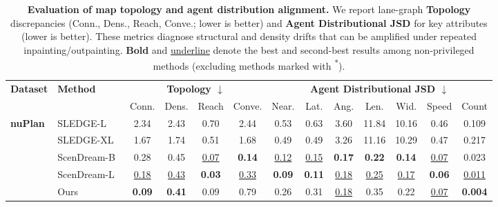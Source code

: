 \documentclass{article}
\newcommand{\best}[1]{\textbf{#1}}
\newcommand{\secbest}[1]{\underline{#1}}
\theoremstyle{plain}
\theoremstyle{definition}
\theoremstyle{remark}
\begin{document}
\begin{table}[t]
\centering
\caption{\textbf{Evaluation of map topology and agent distribution alignment.}
We report lane-graph \textbf{Topology} discrepancies (Conn., Dens., Reach, Conve.; lower is better) and \textbf{Agent Distributional JSD} for key attributes (lower is better). These metrics diagnose structural and density drifts that can be amplified under repeated inpainting/outpainting. \textbf{Bold} and \underline{underline} denote the best and second-best results among non-privileged methods (excluding methods marked with \textsuperscript{*}).}
\label{tab:detailed_metrics}
\setlength{\tabcolsep}{1.8pt} %
\renewcommand{\arraystretch}{0.8}
\begin{tabular}{@{}llccccccccccc@{}}
\toprule
\multirow{2}{*}{\textbf{Dataset}} & \multirow{2}{*}{\textbf{Method}} & \multicolumn{4}{c}{\textbf{Topology $\downarrow$}} & \multicolumn{7}{c}{\textbf{Agent Distributional JSD $\downarrow$}} \\
\cmidrule(lr){3-6} \cmidrule(lr){7-13}
 & & Conn. & Dens. & Reach & Conve. & Near. & Lat. & Ang. & Len. & Wid. & Speed & Count \\
\midrule

\multirow{5}{*}{\textbf{nuPlan}}
& SLEDGE-L~\cite{chitta2024sledge} & 2.34 & 2.43 & 0.70 & 2.44 & 0.53 & 0.63 & 3.60 & 11.84 & 10.16 & 0.46 & 0.109 \\
& SLEDGE-XL~\cite{chitta2024sledge} & 1.67 & 1.74 & 0.51 & 1.68 & 0.49 & 0.49 & 3.26 & 11.16 & 10.29 & 0.47 & 0.217 \\
& ScenDream-B~\cite{rowe2025scenario} & 0.28 & 0.45 & \secbest{0.07} & \best{0.14} & \secbest{0.12} & \secbest{0.15} & \best{0.17} & \best{0.22} & \best{0.14} & \secbest{0.07} & 0.023 \\
& ScenDream-L~\cite{rowe2025scenario} & \secbest{0.18} & \secbest{0.43} & \best{0.03} & \secbest{0.33} & \best{0.09} & \best{0.11} & \secbest{0.18} & \secbest{0.25} & \secbest{0.17} & \best{0.06} & \secbest{0.011} \\
& \cellcolor{oursrow}Ours & \cellcolor{oursrow}\best{0.09} & \cellcolor{oursrow}\best{0.41} & \cellcolor{oursrow}0.09 & \cellcolor{oursrow}0.79 & \cellcolor{oursrow}0.26 & \cellcolor{oursrow}0.31 & \cellcolor{oursrow}\secbest{0.18} & \cellcolor{oursrow}0.35 & \cellcolor{oursrow}0.22 & \cellcolor{oursrow}\secbest{0.07} & \cellcolor{oursrow}\best{0.004} \\


\end{tabular}
\end{table}
\end{document}
